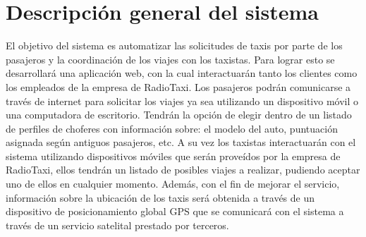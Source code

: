 
\lstset{escapechar=@,style=customc}




\fecha{\today}

\grupo{}


\maketitle

\tableofcontents
\newpage

\section{Descripción general del sistema}
El objetivo del sistema es automatizar las solicitudes de taxis por parte de los pasajeros y la coordinación de los viajes con los taxistas. Para lograr esto se desarrollará una aplicación web, con la cual interactuarán tanto los clientes como los empleados de la empresa de RadioTaxi. Los pasajeros podrán comunicarse a través de internet para solicitar los viajes ya sea utilizando un dispositivo móvil o una computadora de escritorio. Tendrán la opción de elegir dentro de un listado de perfiles de choferes con información sobre: el modelo del auto, puntuación asignada según antiguos pasajeros, etc. A su vez los taxistas interactuarán con el sistema utilizando dispositivos móviles que serán prove\'idos por la empresa de RadioTaxi, ellos tendrán un listado de posibles viajes a realizar, pudiendo aceptar uno de ellos en cualquier momento. Además, con el fin de mejorar el servicio, información sobre la ubicación de los taxis será obtenida a través de un dispositivo de posicionamiento global GPS que se comunicará con el sistema a través de un servicio satelital prestado por terceros.


